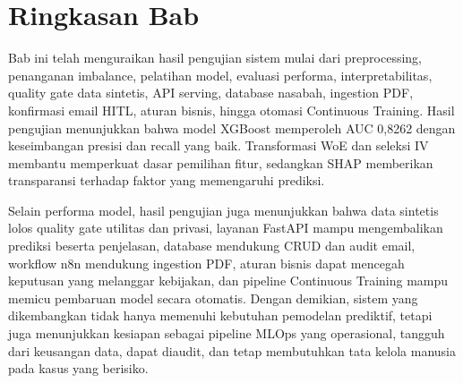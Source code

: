 \section{Ringkasan Bab}
\label{sec:bab4_ringkasan}
Bab ini telah menguraikan hasil pengujian sistem mulai dari preprocessing, penanganan imbalance, pelatihan model, evaluasi performa, interpretabilitas, quality gate data sintetis, API serving, database nasabah, ingestion PDF, konfirmasi email HITL, aturan bisnis, hingga otomasi Continuous Training. Hasil pengujian menunjukkan bahwa model XGBoost memperoleh AUC 0,8262 dengan keseimbangan presisi dan recall yang baik. Transformasi WoE dan seleksi IV membantu memperkuat dasar pemilihan fitur, sedangkan SHAP memberikan transparansi terhadap faktor yang memengaruhi prediksi.

Selain performa model, hasil pengujian juga menunjukkan bahwa data sintetis lolos quality gate utilitas dan privasi, layanan FastAPI mampu mengembalikan prediksi beserta penjelasan, database mendukung CRUD dan audit email, workflow n8n mendukung ingestion PDF, aturan bisnis dapat mencegah keputusan yang melanggar kebijakan, dan pipeline Continuous Training mampu memicu pembaruan model secara otomatis. Dengan demikian, sistem yang dikembangkan tidak hanya memenuhi kebutuhan pemodelan prediktif, tetapi juga menunjukkan kesiapan sebagai pipeline MLOps yang operasional, tangguh dari keusangan data, dapat diaudit, dan tetap membutuhkan tata kelola manusia pada kasus yang berisiko.
